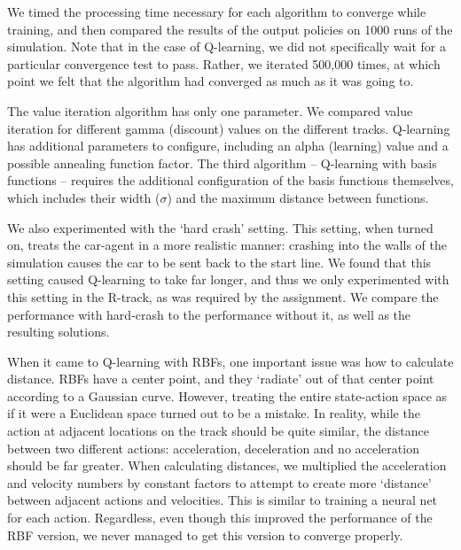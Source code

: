 \documentclass[12pt, letterpaper]{article}
\begin{document}
We timed the processing time necessary for each algorithm to converge while training, and then compared the results of the output policies on 1000 runs of the simulation. Note that in the case of Q-learning, we did not specifically wait for a particular convergence test to pass. Rather, we iterated 500,000 times, at which point we felt that the algorithm had converged as much as it was going to.

The value iteration algorithm has only one parameter. We compared value iteration for different gamma (discount) values on the different tracks. Q-learning has additional parameters to configure, including an alpha (learning) value and a possible annealing function factor. The third algorithm -- Q-learning with basis functions -- requires the additional configuration of the basis functions themselves, which includes their width ($\sigma$) and the maximum distance between functions.

We also experimented with the `hard crash' setting. This setting, when turned on, treats the car-agent in a more realistic manner: crashing into the walls of the simulation causes the car to be sent back to the start line. We found that this setting caused Q-learning to take far longer, and thus we only experimented with this setting in the R-track, as was required by the assignment. We compare the performance with hard-crash to the performance without it, as well as the resulting solutions.

When it came to Q-learning with RBFs, one important issue was how to calculate distance. RBFs have a center point, and they `radiate' out of that center point according to a Gaussian curve. However, treating the entire state-action space as if it were a Euclidean space turned out to be a mistake. In reality, while the action at adjacent locations on the track should be quite similar, the distance between two different actions: acceleration, deceleration and no acceleration should be far greater. When calculating distances, we multiplied the acceleration and velocity numbers by constant factors to attempt to create more `distance' between adjacent actions and velocities. This is similar to training a neural net for each action. Regardless, even though this improved the performance of the RBF version, we never managed to get this version to converge properly.
\end{document}

